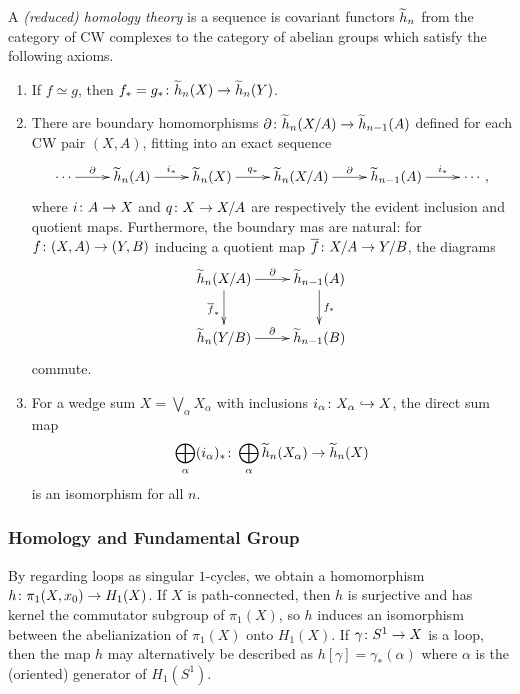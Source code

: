 \begin{definition}
  A \emph{(reduced) homology theory} is a sequence is covariant functors $\widetilde{h}_n$ from the category of CW complexes to the category of abelian groups which satisfy the following axioms.
  \begin{enumerate}[(1)]
  \item If $f \simeq g$, then $f_\ast = g_\ast \colon \widetilde{h}_n(X) \rightarrow \widetilde{h}_n(Y)$.
  \item There are boundary homomorphisms $\partial \colon \widetilde{h}_n(X/A) \rightarrow \widetilde{h}_{n-1}(A)$ defined for each CW pair $(X,A)$, fitting into an exact sequence
    \[\xymatrix{
      \cdots \ar[r]^-\d & \wtilde{h}_n(A) \ar[r]^-{i_\ast} & \wtilde{h}_n(X) \ar[r]^-{q_\ast} & \wtilde{h}_n(X/A) \ar[r]^-{\d} & \wtilde{h}_{n-1}(A) \ar[r]^-{i_\ast} & \cdots,
    }\]
    where $i \colon A \rightarrow X$ and $q \colon X \rightarrow X/A$ are respectively the evident inclusion and quotient maps. Furthermore, the boundary mas are natural: for $f \colon (X,A) \rightarrow (Y,B)$ inducing a quotient map $\overline{f} \colon X/A \rightarrow Y/B$, the diagrams
    \[\xymatrix{
      \wtilde{h}_n(X/A) \ar[r]^-\d \ar[d]_{\overline{f}_\ast} & \wtilde{h}_{n-1}(A) \ar[d]^-{f_\ast} \\
      \wtilde{h}_n(Y/B) \ar[r]^-\d & \wtilde{h}_{n-1}(B)
    }\]
    commute.
  \item For a wedge sum $X = \bigvee_\alpha X_\alpha$ with inclusions $i_\alpha \colon X_\alpha \hookrightarrow X$, the direct sum map
    \[
    \bigoplus_\alpha (i_\alpha)_\ast \colon \bigoplus_\alpha \widetilde{h}_n(X_\alpha) \rightarrow \widetilde{h}_n(X)
    \]
    is an isomorphism for all $n$.
  \end{enumerate}
\end{definition}

\subsubsection{Homology and Fundamental Group}

\begin{theorem}
  By regarding loops as singular $1$-cycles, we obtain a homomorphism $h \colon \pi_1(X, x_0) \rightarrow H_1(X)$. If $X$ is path-connected, then $h$ is surjective and has kernel the commutator subgroup of $\pi_1(X)$, so $h$ induces an isomorphism between the abelianization of $\pi_1(X)$ onto $H_1(X)$. If $\gamma \colon S^1 \rightarrow X$ is a loop, then the map $h$ may alternatively be described as $h[\gamma] = \gamma_\ast(\alpha)$ where $\alpha$ is the (oriented) generator of $H_1(S^1)$.
\end{theorem}

